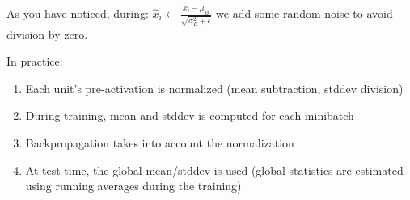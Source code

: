 

As you have noticed, during:
$
\widehat{x}_{i} \leftarrow \frac{x_{i}-\mu_{B}}{\sqrt{\sigma_{B}^{2}+\epsilon}}
$
we add some random noise to avoid division by zero.

In practice: 
\begin{enumerate}
    \item Each unit’s pre-activation is normalized (mean subtraction, stddev division)
    \item During training, mean and stddev is computed for each minibatch
    \item Backpropagation takes into account the normalization
    \item At test time, the global mean/stddev is used (global statistics are estimated using running averages during the training)
\end{enumerate}{}

